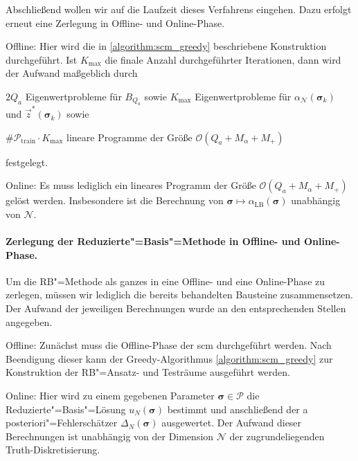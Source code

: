 \documentclass[../main.tex]{subfiles}
\begin{document}
Abschließend wollen wir auf die Laufzeit dieses Verfahrens eingehen.
Dazu erfolgt erneut eine Zerlegung in Offline- und Online-Phase.

\begin{onoffdescription}
    \item[Offline:]
    Hier wird die in \cref{algorithm:scm_greedy} beschriebene Konstruktion durchgeführt.
    Ist $K_{\max}$ die finale Anzahl durchgeführter Iterationen, dann wird der Aufwand maßgeblich durch
    \begin{inlinelist}
        \item $2 Q_a$ Eigenwertprobleme für $B_{Q_a}$ sowie $K_{\max}$ Eigenwertprobleme für $\alpha_{\mathcal N}(\bm \sigma_{k})$ und $\vec{z}^{*}(\bm \sigma_{k})$ sowie
        \item $\#\mathcal P_{\mathrm{train}} \cdot K_{\max}$ lineare Programme der Größe $\mathcal O(Q_a + M_{\alpha} + M_{+})$
    \end{inlinelist}
    festgelegt.

    \item[Online:]
    Es muss lediglich ein lineares Programm der Größe $\mathcal O(Q_a + M_{\alpha} + M_{+})$ gelöst werden.
    Insbesondere ist die Berechnung von $\bm \sigma \mapsto \alpha_{\mathrm{LB}}(\bm \sigma)$ unabhängig von $\mathcal N$.
\end{onoffdescription}


\paragraph{Zerlegung der Reduzierte"=Basis"=Methode in Offline- und Online-Phase.} %
\label{sub:zerlegung_in_offline_und_online_phase}

Um die RB"=Methode als ganzes in eine Offline- und eine Online-Phase zu zerlegen, müssen wir lediglich die bereits behandelten Bausteine zusammensetzen.
Der Aufwand der jeweiligen Berechnungen wurde an den entsprechenden Stellen angegeben.

\begin{onoffdescription}
    \item[Offline:]
    Zunächst muss die Offline-Phase der \acl{scm} durchgeführt werden.
    Nach Beendigung dieser kann der Greedy-Algorithmus \ref{algorithm:scm_greedy} zur Konstruktion der RB"=Ansatz- und Testräume ausgeführt werden.

    \item[Online:]
    Hier wird zu einem gegebenen Parameter $\bm \sigma \in \mathcal P$ die Reduzierte"=Basis"=Lösung $u_{N}(\bm \sigma)$ bestimmt und anschließend der a posteriori"=Fehlerschätzer $\Delta_{N}(\bm \sigma)$ ausgewertet.
    Der Aufwand dieser Berechnungen ist unabhängig von der Dimension $\mathcal N$ der zugrundeliegenden Truth-Diskretisierung.
\end{onoffdescription}
\end{document}
